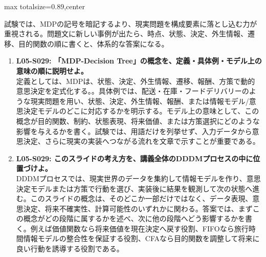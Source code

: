 \begin{minipage}[t]{0.58\textwidth}
\begin{adjustbox}{max totalsize={\textwidth}{0.89\textheight},center}
\begin{minipage}{\textwidth}
試験では、MDPの記号を暗記するより、現実問題を構成要素に落とし込む力が重視される。問題文に新しい事例が出たら、時点、状態、決定、外生情報、遷移、目的関数の順に書くと、体系的な答案になる。\par{}\begin{enumerate}\item \textbf{L05-S029: 「MDP-Decision Tree」の概念を、定義・具体例・モデル上の意味の順に説明せよ。}\\定義としては、MDPは、状態、決定、外生情報、遷移、報酬、方策で動的意思決定を定式化する。。具体例では、配送・在庫・フードデリバリーのような現実問題を用い、状態、決定、外生情報、報酬、または情報モデル/意思決定モデルのどこに対応するかを明示する。モデル上の意味として、この概念が目的関数、制約、状態表現、将来価値、または方策選択にどのような影響を与えるかを書く。試験では、用語だけを列挙せず、入力データから意思決定、さらに現実の実装へつながる流れを文章で示すことが重要である。\item \textbf{L05-S029: このスライドの考え方を、講義全体のDDDMプロセスの中に位置づけよ。}\\DDDMプロセスでは、現実世界のデータを集約して情報モデルを作り、意思決定モデルまたは方策で行動を選び、実装後に結果を観測して次の状態へ進む。このスライドの概念は、そのどこか一部だけではなく、データ表現、意思決定、将来不確実性、計算可能性のいずれかに関わる。答案では、まずこの概念がどの段階に属するかを述べ、次に他の段階へどう影響するかを書く。例えば価値関数なら将来価値を現在決定へ戻す役割、FIFOなら旅行時間情報モデルの整合性を保証する役割、CFAなら目的関数を調整して将来に良い行動を誘導する役割である。\end{enumerate}
\end{minipage}
\end{adjustbox}
\end{minipage}



